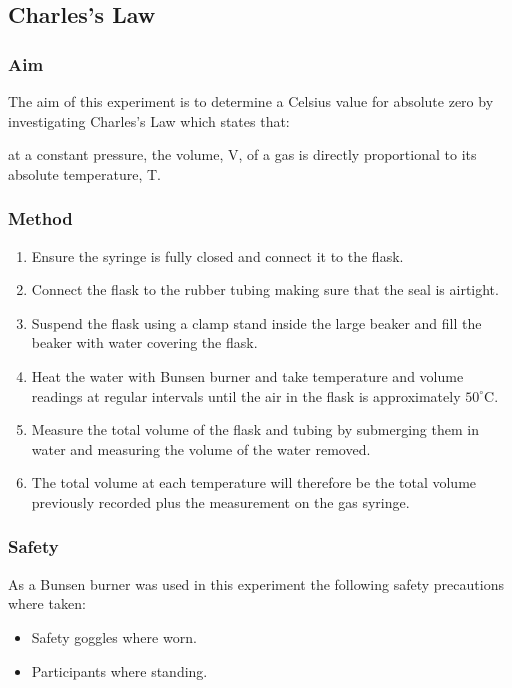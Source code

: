 \subsection{Charles's Law}
\setcounter{equation}{0}

\subsubsection{Aim}
The aim of this experiment is to determine a Celsius value for absolute zero by investigating Charles's Law which states that:
\begin{quoting}
  at a constant pressure, the volume, V, of a gas is directly proportional to its absolute temperature, T.
\end{quoting}

\subsubsection{Method}
\begin{enumerate}
  \item Ensure the syringe is fully closed and connect it to the flask.
  \item Connect the flask to the rubber tubing making sure that the seal is airtight.
  \item Suspend the flask using a clamp stand inside the large beaker and fill the beaker with water covering the flask.
  \item Heat the water with Bunsen burner and take temperature and volume readings at regular intervals until the air in the flask is approximately $50^\circ$C.
  \item Measure the total volume of the flask and tubing by submerging them in water and measuring the volume of the water removed.
  \item The total volume at each temperature will therefore be the total volume previously recorded plus the measurement on the gas syringe.
\end{enumerate}

\subsubsection{Safety}
As a Bunsen burner was used in this experiment the following safety precautions where taken:
\begin{itemize}
  \item Safety goggles where worn.
  \item Participants where standing.
\end{itemize}

